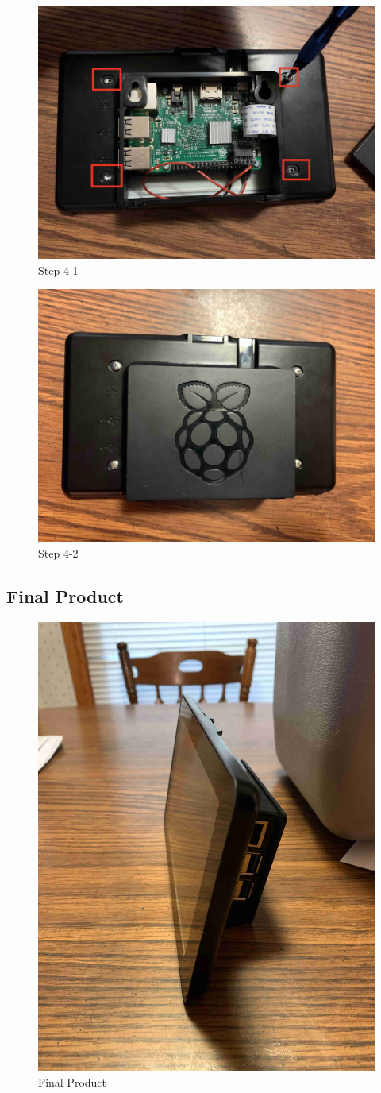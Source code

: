 \documentclass{article}
\numberwithin{figure}{section}
\begin{document}
\begin{figure}[H]
\centering
\includegraphics[width=0.7\columnwidth]{./resources/comp-3.jpeg}
\caption{Step 4-1}
\end{figure}

\begin{figure}[H]
\centering
\includegraphics[width=0.7\columnwidth]{./resources/comp-4.jpeg}
\caption{Step 4-2}
\end{figure}

\subsection{Final Product}
\begin{figure}[H]
\centering
\includegraphics[width=0.5\columnwidth]{./resources/comp-5.jpeg}
\caption{Final Product}
\end{figure}
\end{document}
